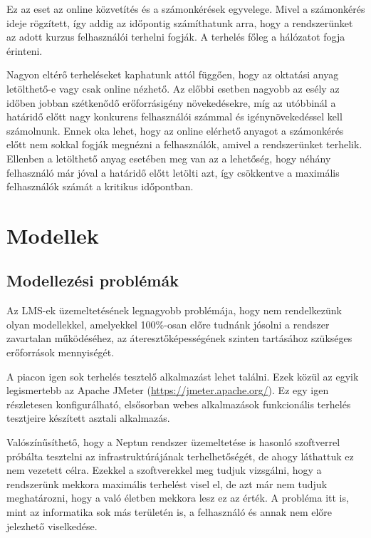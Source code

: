 Ez az eset az online közvetítés és a számonkérések egyvelege. Mivel a számonkérés ideje rögzített, így addig az időpontig számíthatunk arra, hogy a rendszerünket az adott kurzus felhasználói terhelni fogják. A terhelés főleg a hálózatot fogja érinteni.

Nagyon eltérő terheléseket kaphatunk attól függően, hogy az oktatási anyag letölthető-e vagy csak online nézhető. Az előbbi esetben nagyobb az esély az időben jobban szétkenődő erőforrásigény növekedésekre, míg az utóbbinál a határidő előtt nagy konkurens felhasználói számmal és igénynövekedéssel kell számolnunk. Ennek oka lehet, hogy az online elérhető anyagot a számonkérés előtt nem sokkal fogják megnézni a felhasználók, amivel a rendszerünket terhelik. Ellenben a letölthető anyag esetében meg van az a lehetőség, hogy néhány felhasználó már jóval a határidő előtt letölti azt, így csökkentve a maximális felhasználók számát a kritikus időpontban.

\section{Modellek}\label{sec:modellek}

\subsection{Modellezési problémák}

Az LMS-ek üzemeltetésének legnagyobb problémája, hogy nem rendelkezünk olyan modellekkel, amelyekkel 100\%-osan előre tudnánk jósolni a rendszer zavartalan működéséhez, az áteresztőképességének szinten tartásához szükséges erőforrások mennyiségét.

A piacon igen sok terhelés tesztelő alkalmazást lehet találni. Ezek közül az egyik legismertebb az Apache JMeter (\href{https://jmeter.apache.org/}{https://jmeter.apache.org/}). Ez egy igen részletesen konfigurálható, elsősorban webes alkalmazások funkcionális terhelés tesztjeire készített asztali alkalmazás.

Valószínűsíthető, hogy a Neptun rendszer üzemeltetése is hasonló szoftverrel próbálta tesztelni az infrastruktúrájának terhelhetőségét, de ahogy láthattuk ez nem vezetett célra. Ezekkel a szoftverekkel meg tudjuk vizsgálni, hogy a rendszerünk mekkora maximális terhelést visel el, de azt már nem tudjuk meghatározni, hogy a való életben mekkora lesz ez az érték. A probléma itt is, mint az informatika sok más területén is, a felhasználó és annak nem előre jelezhető viselkedése.

